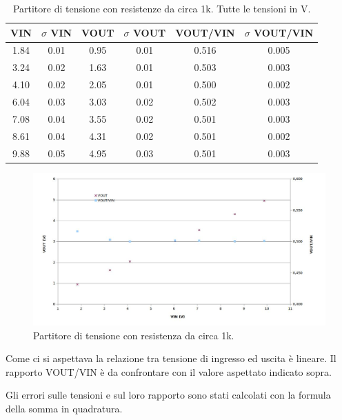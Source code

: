 \documentclass[10pt,a4paper]{article}
\newcommand{\rem}[1]{[\emph{#1}]}
\begin{document}
\begin{table}[h]
\centering
\begin{tabular}{|c|c|c|c|c|c|}
\hline 
VIN& $\sigma$ VIN  &VOUT	 & $\sigma$ VOUT& VOUT/VIN & $\sigma$ VOUT/VIN \\
\hline 
1.84&0.01&0.95&0.01&0.516&0.005\\
3.24&0.02&1.63&0.01&0.503&0.003\\
4.10&0.02&2.05&0.01&0.500&0.002\\
6.04&0.03&3.03&0.02&0.502&0.003\\
7.08&0.04&3.55&0.02&0.501&0.003\\
8.61&0.04&4.31&0.02&0.501&0.002\\
9.88&0.05&4.95&0.03&0.501&0.003\\
\hline 
\end{tabular} 
\caption{Partitore di tensione con resistenze da circa 1k. Tutte le tensioni in V.\label{t:par1}}
\end{table}
\begin{figure}
\centering
\includegraphics[scale=0.6]{part1.jpg}
\caption{Partitore di tensione con resistenza da circa 1k.\label{f:par1}}
\end{figure}
Come ci si aspettava la relazione tra tensione di ingresso ed uscita \`e lineare. Il rapporto VOUT/VIN \`e da confrontare con il valore aspettato indicato sopra.

Gli errori sulle tensioni e sul loro rapporto sono stati calcolati con la formula della somma in quadratura.
 
\end{document}
